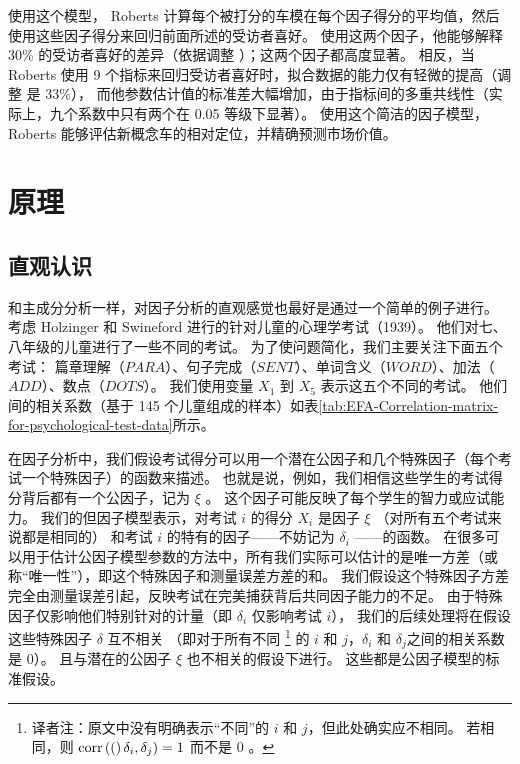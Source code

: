 使用这个模型， Roberts 计算每个被打分的车模在每个因子得分的平均值，然后使用这些因子得分来回归前面所述的受访者喜好。
使用这两个因子，他能够解释 30\% 的受访者喜好的差异（依据调整 \rsquare）；这两个因子都高度显著。
相反，当 Roberts 使用 9 个指标来回归受访者喜好时，拟合数据的能力仅有轻微的提高（调整 \rsquare 是 33\%），
而他参数估计值的标准差大幅增加，由于指标间的多重共线性（实际上，九个系数中只有两个在 0.05 等级下显著）。
使用这个简洁的因子模型， Roberts 能够评估新概念车的相对定位，并精确预测市场价值。

\section{原理}

\subsection{直观认识}

和主成分分析一样，对因子分析的直观感觉也最好是通过一个简单的例子进行。
考虑 Holzinger 和 Swineford 进行的针对儿童的心理学考试（1939）。
他们对七、八年级的儿童进行了一些不同的考试。
为了使问题简化，我们主要关注下面五个考试：
篇章理解（$ PARA $）、句子完成（$ SENT $）、单词含义（$ WORD $）、加法（$ ADD $）、数点（$ DOTS $）。
我们使用变量 $ X_1 $ 到 $ X_5 $ 表示这五个不同的考试。
他们间的相关系数（基于 145 个儿童组成的样本）如表\ref{tab:EFA-Correlation-matrix-for-psychological-test-data}所示。

在因子分析中，我们假设考试得分可以用一个潜在公因子和几个特殊因子（每个考试一个特殊因子）的函数来描述。
也就是说，例如，我们相信这些学生的考试得分背后都有一个公因子，记为 $ \xi $ 。
这个因子可能反映了每个学生的智力或应试能力。
我们的但因子模型表示，对考试 $ i $ 的得分 $ X_i $ 是因子 $ \xi $ （对所有五个考试来说都是相同的）
和考试 $ i $ 的特有的因子——不妨记为 $ \delta_i $ ——的函数。
在很多可以用于估计公因子模型参数的方法中，所有我们实际可以估计的是唯一方差（或称“唯一性”），即这个特殊因子和测量误差方差的和。
我们假设这个特殊因子方差完全由测量误差引起，反映考试在完美捕获背后共同因子能力的不足。
由于特殊因子仅影响他们特别针对的计量（即 $ \delta_i $ 仅影响考试 $ i $），
我们的后续处理将在假设这些特殊因子 $ \delta $ 互不相关
（即对于所有不同\!
\footnote{译者注：原文中没有明确表示“不同”的 $ i $ 和 $ j $，但此处确实应不相同。
若相同，则 $ \mathrm{corr}\left({(}\right)\delta_i,\delta_j) = 1 $ 而不是 $ 0 $ 。}\!
的 $ i $ 和 $ j $，$ \delta_i $ 和 $ \delta_j $之间的相关系数是 0）。
且与潜在的公因子 $ \xi $ 也不相关的假设下进行。
这些都是公因子模型的标准假设。

